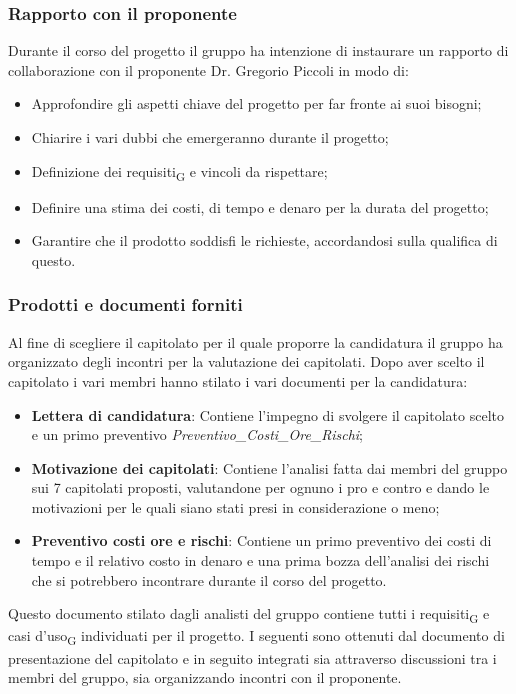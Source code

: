 \subsubsection{Rapporto con il proponente}
Durante il corso del progetto il gruppo ha intenzione di instaurare un rapporto di collaborazione con il proponente Dr. Gregorio Piccoli in modo di:
\begin{itemize}
	\item Approfondire gli aspetti chiave del progetto per far fronte ai suoi bisogni;
	\item Chiarire i vari dubbi che emergeranno durante il progetto;
	\item Definizione dei requisiti\textsubscript{G} e vincoli da rispettare;
	\item Definire una stima dei costi, di tempo e denaro per la durata del progetto;
	\item Garantire che il prodotto soddisfi le richieste, accordandosi sulla qualifica di questo.
\end{itemize} 

\subsubsection{Prodotti e documenti forniti}
Al fine di scegliere il capitolato per il quale proporre la candidatura il gruppo ha organizzato degli incontri per la valutazione dei capitolati. Dopo aver scelto il capitolato i vari membri hanno stilato i vari documenti per la candidatura:
\begin{itemize}
	\item \textbf{Lettera di candidatura}: Contiene l'impegno di svolgere il capitolato scelto e un primo preventivo \textit{Preventivo\_Costi\_Ore\_Rischi};
	\item \textbf{Motivazione dei capitolati}: Contiene l'analisi fatta dai membri del gruppo sui 7 capitolati proposti, valutandone per ognuno i pro e contro e dando le motivazioni per le quali siano stati presi in considerazione o meno;
	\item \textbf{Preventivo costi ore e rischi}: Contiene un primo preventivo dei costi di tempo e il relativo costo in denaro e una prima bozza dell'analisi dei rischi che si potrebbero incontrare durante il corso del progetto.
\end{itemize}
Questo documento stilato dagli analisti del gruppo contiene tutti i requisiti\textsubscript{G} e casi d'uso\textsubscript{G} individuati per il progetto. I seguenti sono ottenuti dal documento di presentazione del capitolato e in seguito integrati sia attraverso discussioni tra i membri del gruppo, sia organizzando incontri con il proponente. 
